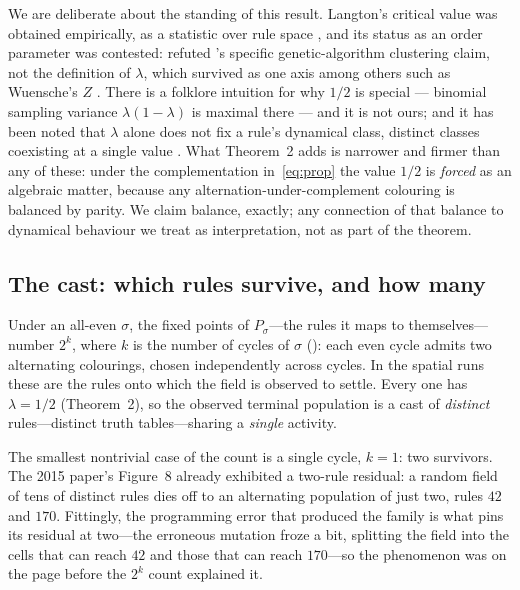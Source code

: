 \documentclass[man,12pt,floatsintext,donotrepeattitle]{apa7}
\newcommand{\sig}{\sigma}
\newcommand{\secref}[1]{\emph{\nameref{#1}}}
\begin{document}
We are deliberate about the standing of this result. Langton's critical
value was obtained empirically, as a statistic over rule space
\parencite{langton1990computation}, and its status as an order parameter
was contested: \textcite{mitchell1993revisiting} refuted
\textcite{packard1988adaptation}'s specific genetic-algorithm clustering
claim, not the definition of $\lambda$, which survived as one axis among
others such as Wuensche's $Z$ \parencite{wuensche1999classifying}. There is
a folklore intuition for why $1/2$ is special --- binomial sampling variance
$\lambda(1-\lambda)$ is maximal there --- and it is not ours; and it has been
noted that $\lambda$ alone does not fix a rule's dynamical class, distinct
classes coexisting at a single value \parencite{sakai2002edge}. What
Theorem~2 adds is narrower and firmer than any of these: under
the complementation in~\eqref{eq:prop} the value $1/2$ is \emph{forced} as an
algebraic matter, because any alternation-under-complement colouring is
balanced by parity. We claim balance, exactly; any connection of that
balance to dynamical behaviour we treat as interpretation, not as part of the
theorem.

\subsection{The cast: which rules survive, and how many}

Under an all-even $\sig$, the fixed points of $P_\sig$---the rules it maps to
themselves---number $2^k$, where $k$ is the number of cycles of $\sig$
(\secref{sec:classification}): each even cycle admits two alternating
colourings, chosen independently across cycles. In the spatial runs these are
the rules onto which the field is observed to settle. Every one has
$\lambda = 1/2$ (Theorem~2), so the observed terminal
population is a cast of \emph{distinct} rules---distinct truth tables---sharing
a \emph{single} activity.

The smallest nontrivial case of the count is a single cycle, $k = 1$: two
survivors. The 2015 paper's Figure~8 already exhibited a two-rule residual: a
random field of tens of distinct rules dies off to an alternating population of
just two, rules $42$ and $170$.
Fittingly, the programming error that produced the family is what pins its
residual at two---the erroneous mutation froze a bit, splitting the field
into the cells that can reach $42$ and those that can reach $170$---so the
phenomenon was on the page before the $2^k$ count explained it.
\end{document}
